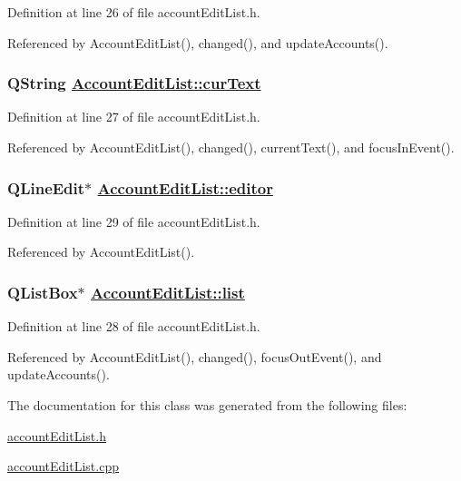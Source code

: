 Definition at line 26 of file account\-Edit\-List.h.

Referenced by Account\-Edit\-List(), changed(), and update\-Accounts().\hypertarget{classAccountEditList_r1}{
\subsubsection[curText]{\setlength{\rightskip}{0pt plus 5cm}QString \hyperlink{classAccountEditList_r1}{Account\-Edit\-List::cur\-Text}}}
\label{classAccountEditList_r1}


Definition at line 27 of file account\-Edit\-List.h.

Referenced by Account\-Edit\-List(), changed(), current\-Text(), and focus\-In\-Event().\hypertarget{classAccountEditList_r3}{
\subsubsection[editor]{\setlength{\rightskip}{0pt plus 5cm}QLine\-Edit$\ast$ \hyperlink{classAccountEditList_r3}{Account\-Edit\-List::editor}}}
\label{classAccountEditList_r3}


Definition at line 29 of file account\-Edit\-List.h.

Referenced by Account\-Edit\-List().\hypertarget{classAccountEditList_r2}{
\subsubsection[list]{\setlength{\rightskip}{0pt plus 5cm}QList\-Box$\ast$ \hyperlink{classAccountEditList_r2}{Account\-Edit\-List::list}}}
\label{classAccountEditList_r2}


Definition at line 28 of file account\-Edit\-List.h.

Referenced by Account\-Edit\-List(), changed(), focus\-Out\-Event(), and update\-Accounts().

The documentation for this class was generated from the following files:\begin{CompactItemize}
\item 
\hyperlink{accountEditList_8h}{account\-Edit\-List.h}\item 
\hyperlink{accountEditList_8cpp}{account\-Edit\-List.cpp}\end{CompactItemize}
